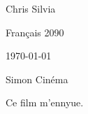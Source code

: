 \documentclass[12pt]{article}
\begin{document}
\begin{flushright}
Chris Silvia

Français 2090

\today

\end{flushright}

\begin{centering}

Simon Cinéma

\end{centering}

\begin{doublespace}

Ce film m'ennyue.

\end{doublespace}
\end{document}
